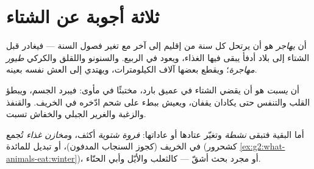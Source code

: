 \section{ثلاثة أجوبة عن الشتاء}

\begin{definition}[الهجرة]\label{def:g3:animals-through-seasons:migration}
أن \emph{يهاجر}  هو أن يرتحل كل سنة من إقليم
إلى آخر مع تغير فصول السنة --- فيغادر قبل الشتاء إلى بلاد أدفأ
يبقى فيها الغذاء، ويعود في الربيع. والسنونو واللقلق والكركي
\emph{طيور مهاجرة}؛ ويقطع بعضها آلاف الكيلومترات،
ويهتدي إلى العش نفسه بعينه.
\end{definition}

\begin{definition}\label{def:g3:animals-through-seasons:hibernation}
أن \emph{يسبت}  هو أن يقضي الشتاء في  عميق
بارد، مختبئًا في مأوى: فيبرد الجسم، ويبطؤ القلب والتنفس حتى
يكادان يقفان، ويعيش  ببطء على شحم ادّخره في الخريف. والقنفذ
والزغبة والغرير الجبلي والخفاش تسبت.
\end{definition}

\begin{definition}\label{def:g3:animals-through-seasons:active}
أما البقية فتبقى \emph{نشطة}
وتغيّر عتادها أو عاداتها: \emph{فروة شتوية}
أكثف، و\emph{مخازن غذاء} تُجمع في الخريف
(كجوز السنجاب المدفون)، أو تبديل للمائدة
(كشحرور \cref{ex:g2:what-animals-eat:winter})، أو مجرد بحث أشقّ
--- كالثعلب والأيّل وأبي الحنّاء.
\end{definition}

